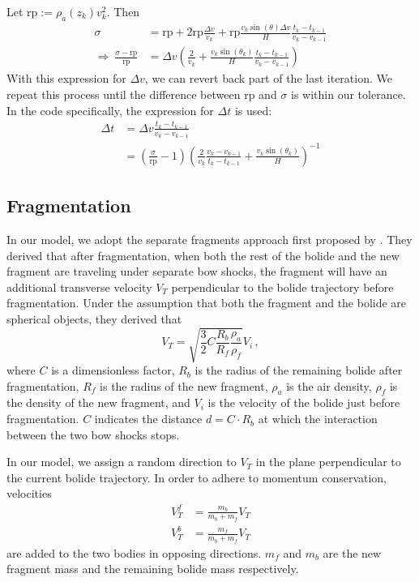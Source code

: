 Let $\mathrm{rp} := \rho_a(z_k)v_k^2$. Then
\begin{align*}
    \sigma &= \mathrm{rp} + 2\mathrm{rp}\frac{\Delta v}{v_k} + \mathrm{rp}\frac{v_k\sin(\theta)\Delta v}{H}\frac{t_k - t_{k-1}}{v_k - v_{k-1}} \\
    \Rightarrow\ \frac{\sigma - \mathrm{rp}}{\mathrm{rp}} &= \Delta v \left(\frac{2}{v_k} + \frac{v_k\sin(\theta_k)}{H}\frac{t_k - t_{k-1}}{v_k - v_{k-1}}\right)
\end{align*}
With this expression for $\Delta v$, we can revert back part of the last iteration. We repeat this process until the difference between $\mathrm{rp}$ and $\sigma$ is within our tolerance. In the code specifically, the expression for $\Delta t$ is used:
\begin{align}
    \Delta t &= \Delta v \frac{t_k - t_{k-1}}{v_k - v_{k-1}} \nonumber \\
    &= \left(\frac{\sigma}{\mathrm{rp}} - 1\right) \left(\frac{2}{v_k}\frac{v_k - v_{k-1}}{t_k - t_{k-1}} + \frac{v_k\sin(\theta_k)}{H}\right)^{-1}
\end{align}

\subsection{Fragmentation}

In our model, we adopt the separate fragments approach first proposed by \cite{passey1980effects}.
They derived that after fragmentation, when both the rest of the bolide and the new fragment are traveling under separate bow shocks, 
the fragment will have an additional transverse velocity $V_T$ perpendicular to the bolide trajectory before fragmentation.
Under the assumption that both the fragment and the bolide are spherical objects,
they derived that
\begin{equation}
    V_T = \sqrt{\frac{3}{2}C\frac{R_b}{R_f}\frac{\rho_a}{\rho_f}}V_i\,,
    \label{eq:v_t}
\end{equation}
where $C$ is a dimensionless factor, $R_b$ is the radius of the remaining bolide after fragmentation,
$R_f$ is the radius of the new fragment, $\rho_a$ is the air density, $\rho_f$ is the density of the new fragment,
and $V_i$ is the velocity of the bolide just before fragmentation. $C$ indicates the distance $d = C\cdot R_b$ at which the interaction between the two bow shocks stops.

In our model, we assign a random direction to $V_T$ in the plane perpendicular to the current bolide trajectory.
In order to adhere to momentum conservation, velocities
\begin{align}
    V_T^f &= \frac{m_b}{m_b + m_f}V_T \\
    V_T^b &= \frac{m_f}{m_b + m_f}V_T
    \label{eq:v_t_star}
\end{align}
are added to the two bodies in opposing directions.
$m_f$ and $m_b$ are the new fragment mass and the remaining bolide mass respectively.

